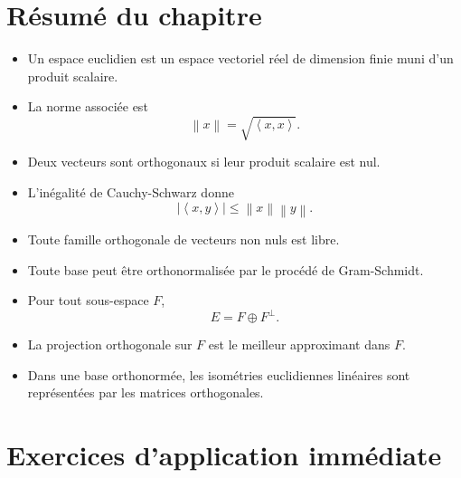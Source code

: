 \documentclass[11pt,a4paper]{article}
\theoremstyle{remark}
\newcommand{\Norm}[1]{\left\|#1\right\|}
\newcommand{\abs}[1]{\left|#1\right|}
\newcommand{\scal}[2]{\left\langle #1,#2\right\rangle}
\newcommand{\Orth}{\perp}
\begin{document}
\section{Résumé du chapitre}

\begin{itemize}
    \item Un espace euclidien est un espace vectoriel réel de dimension finie muni d’un produit scalaire.
    \item La norme associée est
    \[
    \Norm{x}=\sqrt{\scal{x}{x}}.
    \]
    \item Deux vecteurs sont orthogonaux si leur produit scalaire est nul.
    \item L’inégalité de Cauchy-Schwarz donne
    \[
    \abs{\scal{x}{y}}\le \Norm{x}\Norm{y}.
    \]
    \item Toute famille orthogonale de vecteurs non nuls est libre.
    \item Toute base peut être orthonormalisée par le procédé de Gram-Schmidt.
    \item Pour tout sous-espace \(F\),
    \[
    E=F\oplus F^\Orth.
    \]
    \item La projection orthogonale sur \(F\) est le meilleur approximant dans \(F\).
    \item Dans une base orthonormée, les isométries euclidiennes linéaires sont représentées par les matrices orthogonales.
\end{itemize}

\section*{Exercices d’application immédiate}
\end{document}

